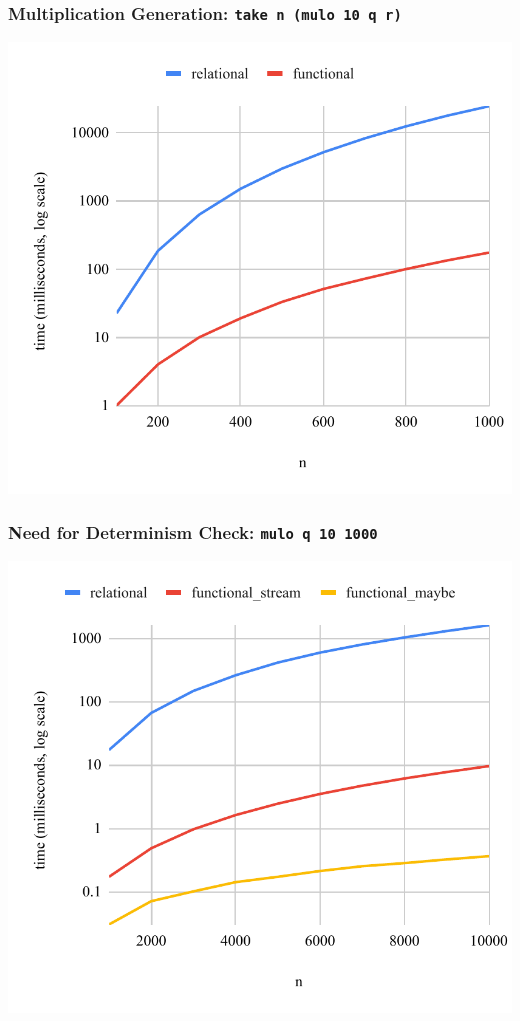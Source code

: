 \documentclass[xcolor=table]{beamer}
\begin{document}
\begin{frame}[fragile]
  \frametitle{Multiplication Generation: \lstinline[basicstyle=\Large]{take n (mulo 10 q r)}}
  \begin{center}
    \includegraphics[height=0.85\textheight]{figures/muloIOI.pdf}
  \end{center}
\end{frame}

\begin{frame}[fragile]
  \frametitle{Need for Determinism Check: \lstinline[basicstyle=\Large]{mulo q 10 1000}}
  \begin{center}
    \includegraphics[height=0.85\textheight]{figures/maybe.pdf}
  \end{center}
\end{frame}
\end{document}
